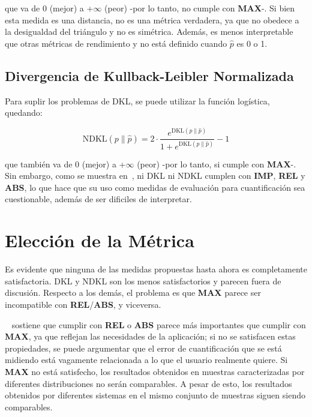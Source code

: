 que va de {0} (mejor) a {+$\infty$} (peor) -por lo tanto, no cumple con {\bf
MAX}-. Si bien esta medida es una distancia, no es una métrica verdadera, ya que
no obedece a la desigualdad del triángulo y no es simétrica. Además, es menos
interpretable que otras métricas de rendimiento y no está definido cuando
$\hat{p}$ es 0 o 1.

\subsection{Divergencia de Kullback-Leibler Normalizada}

Para suplir los problemas de DKL, se puede utilizar la función logística,
quedando:

\begin{equation}
    {\text{NDKL}}(p\parallel \hat{p}) = 2 \cdot \frac{e^{{\text{DKL}}(p\parallel \hat{p})}}{1+e^{{\text{DKL}}(p\parallel \hat{p})}}-1
\end{equation}

que también va de {0} (mejor) a {+$\infty$} (peor) -por lo tanto, si cumple con
{\bf MAX}-. Sin embargo, como se muestra en~\cite{sebastiani2020evaluation}, ni
DKL ni NDKL cumplen con {\bf IMP}, {\bf REL} y {\bf ABS}, lo que hace que su uso
como medidas de evaluación para cuantificación sea cuestionable, además de ser
dificiles de interpretar.

\section{Elección de la Métrica}\label{evaluacion:eleccion}

Es evidente que ninguna de las medidas propuestas hasta ahora es completamente
satisfactoria. DKL y NDKL son los menos satisfactorios y parecen fuera de
discusión. Respecto a los demás, el problema es que {\bf MAX} parece ser
incompatible con {\bf REL}/{\bf ABS}, y viceversa.

~\citet{sebastiani2020evaluation} sostiene que cumplir con {\bf REL} o {\bf ABS}
parece más importantes que cumplir con {\bf MAX}, ya que reflejan las
necesidades de la aplicación; si no se satisfacen estas propiedades, se puede
argumentar que el error de cuantificación que se está midiendo está vagamente
relacionada a lo que el usuario realmente quiere. Si {\bf MAX} no está
satisfecho, los resultados obtenidos en muestras caracterizadas por diferentes
distribuciones no serán comparables. A pesar de esto, los resultados obtenidos
por diferentes sistemas en el mismo conjunto de muestras siguen siendo
comparables.

